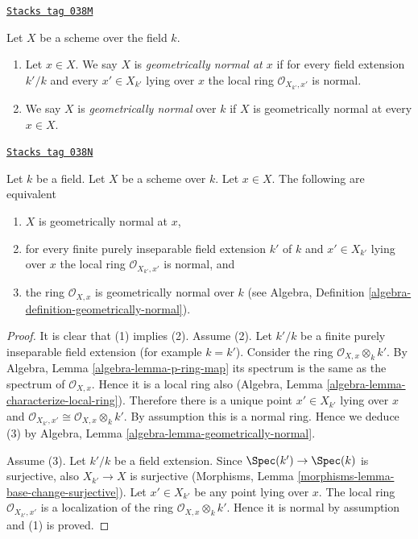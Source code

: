 \begin{definition}
\label{varieties-definition-geometrically-normal}
\href{https://stacks.math.columbia.edu/tag/038M}{\texttt{Stacks tag 038M}}

Let $X$ be a scheme over the field $k$.
\begin{enumerate}
\item Let $x \in X$. We say $X$ is
{\it geometrically normal at $x$} if for every
field extension $k'/k$ and every $x' \in X_{k'}$ lying over $x$
the local ring $\mathcal{O}_{X_{k'}, x'}$ is normal.
\item We say $X$ is {\it geometrically normal} over $k$ if $X$
is geometrically normal at every $x \in X$.
\end{enumerate}
\end{definition}

\begin{lemma}
\label{varieties-lemma-geometrically-normal-at-point}
\href{https://stacks.math.columbia.edu/tag/038N}{\texttt{Stacks tag 038N}}

Let $k$ be a field.
Let $X$ be a scheme over $k$.
Let $x \in X$.
The following are equivalent
\begin{enumerate}
\item $X$ is geometrically normal at $x$,
\item for every finite purely inseparable field extension $k'$ of $k$
and $x' \in X_{k'}$ lying over $x$ the local ring
$\mathcal{O}_{X_{k'}, x'}$ is normal, and
\item the ring $\mathcal{O}_{X, x}$ is geometrically
normal over $k$ (see
Algebra, Definition \ref{algebra-definition-geometrically-normal}).
\end{enumerate}
\end{lemma}

\begin{proof}
It is clear that (1) implies (2). Assume (2). Let $k'/k$ be a finite
purely inseparable field extension (for example $k = k'$). Consider the ring
$\mathcal{O}_{X, x} \otimes_k k'$.
By Algebra, Lemma \ref{algebra-lemma-p-ring-map}
its spectrum is the same as the spectrum of $\mathcal{O}_{X, x}$.
Hence it is a local ring also
(Algebra, Lemma \ref{algebra-lemma-characterize-local-ring}).
Therefore there is a unique point $x' \in X_{k'}$ lying over $x$
and $\mathcal{O}_{X_{k'}, x'} \cong \mathcal{O}_{X, x} \otimes_k k'$.
By assumption this is a normal ring. Hence we deduce (3) by
Algebra, Lemma
\ref{algebra-lemma-geometrically-normal}.

\medskip\noindent
Assume (3). Let $k'/k$ be a field extension. Since
$\Spec(k') \to \Spec(k)$ is surjective, also
$X_{k'} \to X$ is surjective
(Morphisms, Lemma \ref{morphisms-lemma-base-change-surjective}).
Let $x' \in X_{k'}$ be any point lying over $x$.
The local ring $\mathcal{O}_{X_{k'}, x'}$
is a localization of the ring $\mathcal{O}_{X, x} \otimes_k k'$.
Hence it is normal by assumption and (1) is proved.
\end{proof}

